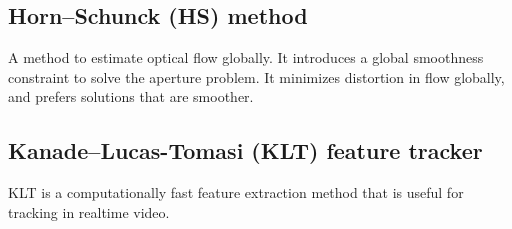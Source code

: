 \subsection{Horn--Schunck (HS) method}\label{ssec:horn-schunck}
A method to estimate optical flow globally. It introduces a global smoothness constraint to solve the aperture problem. It minimizes distortion in flow globally, and prefers solutions that are smoother.

\subsection{Kanade--Lucas-Tomasi (KLT) feature tracker}\label{ssec:kanade-lucas-tomasi}
KLT is a computationally fast feature extraction method that is useful for tracking in realtime video.
